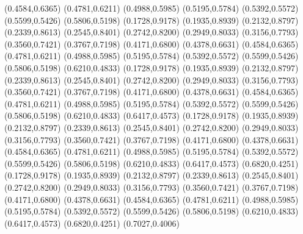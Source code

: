 \PST@Diamond(0.4584,0.6365)
\PST@Diamond(0.4781,0.6211)
\PST@Diamond(0.4988,0.5985)
\PST@Diamond(0.5195,0.5784)
\PST@Diamond(0.5392,0.5572)
\PST@Diamond(0.5599,0.5426)
\PST@Diamond(0.5806,0.5198)
\PST@Diamond(0.1728,0.9178)
\PST@Diamond(0.1935,0.8939)
\PST@Diamond(0.2132,0.8797)
\PST@Diamond(0.2339,0.8613)
\PST@Diamond(0.2545,0.8401)
\PST@Diamond(0.2742,0.8200)
\PST@Diamond(0.2949,0.8033)
\PST@Diamond(0.3156,0.7793)
\PST@Diamond(0.3560,0.7421)
\PST@Diamond(0.3767,0.7198)
\PST@Diamond(0.4171,0.6800)
\PST@Diamond(0.4378,0.6631)
\PST@Diamond(0.4584,0.6365)
\PST@Diamond(0.4781,0.6211)
\PST@Diamond(0.4988,0.5985)
\PST@Diamond(0.5195,0.5784)
\PST@Diamond(0.5392,0.5572)
\PST@Diamond(0.5599,0.5426)
\PST@Diamond(0.5806,0.5198)
\PST@Diamond(0.6210,0.4833)
\PST@Diamond(0.1728,0.9178)
\PST@Diamond(0.1935,0.8939)
\PST@Diamond(0.2132,0.8797)
\PST@Diamond(0.2339,0.8613)
\PST@Diamond(0.2545,0.8401)
\PST@Diamond(0.2742,0.8200)
\PST@Diamond(0.2949,0.8033)
\PST@Diamond(0.3156,0.7793)
\PST@Diamond(0.3560,0.7421)
\PST@Diamond(0.3767,0.7198)
\PST@Diamond(0.4171,0.6800)
\PST@Diamond(0.4378,0.6631)
\PST@Diamond(0.4584,0.6365)
\PST@Diamond(0.4781,0.6211)
\PST@Diamond(0.4988,0.5985)
\PST@Diamond(0.5195,0.5784)
\PST@Diamond(0.5392,0.5572)
\PST@Diamond(0.5599,0.5426)
\PST@Diamond(0.5806,0.5198)
\PST@Diamond(0.6210,0.4833)
\PST@Diamond(0.6417,0.4573)
\PST@Diamond(0.1728,0.9178)
\PST@Diamond(0.1935,0.8939)
\PST@Diamond(0.2132,0.8797)
\PST@Diamond(0.2339,0.8613)
\PST@Diamond(0.2545,0.8401)
\PST@Diamond(0.2742,0.8200)
\PST@Diamond(0.2949,0.8033)
\PST@Diamond(0.3156,0.7793)
\PST@Diamond(0.3560,0.7421)
\PST@Diamond(0.3767,0.7198)
\PST@Diamond(0.4171,0.6800)
\PST@Diamond(0.4378,0.6631)
\PST@Diamond(0.4584,0.6365)
\PST@Diamond(0.4781,0.6211)
\PST@Diamond(0.4988,0.5985)
\PST@Diamond(0.5195,0.5784)
\PST@Diamond(0.5392,0.5572)
\PST@Diamond(0.5599,0.5426)
\PST@Diamond(0.5806,0.5198)
\PST@Diamond(0.6210,0.4833)
\PST@Diamond(0.6417,0.4573)
\PST@Diamond(0.6820,0.4251)
\PST@Diamond(0.1728,0.9178)
\PST@Diamond(0.1935,0.8939)
\PST@Diamond(0.2132,0.8797)
\PST@Diamond(0.2339,0.8613)
\PST@Diamond(0.2545,0.8401)
\PST@Diamond(0.2742,0.8200)
\PST@Diamond(0.2949,0.8033)
\PST@Diamond(0.3156,0.7793)
\PST@Diamond(0.3560,0.7421)
\PST@Diamond(0.3767,0.7198)
\PST@Diamond(0.4171,0.6800)
\PST@Diamond(0.4378,0.6631)
\PST@Diamond(0.4584,0.6365)
\PST@Diamond(0.4781,0.6211)
\PST@Diamond(0.4988,0.5985)
\PST@Diamond(0.5195,0.5784)
\PST@Diamond(0.5392,0.5572)
\PST@Diamond(0.5599,0.5426)
\PST@Diamond(0.5806,0.5198)
\PST@Diamond(0.6210,0.4833)
\PST@Diamond(0.6417,0.4573)
\PST@Diamond(0.6820,0.4251)
\PST@Diamond(0.7027,0.4006)
